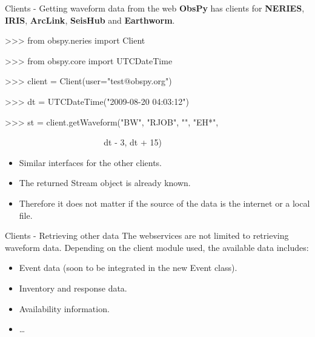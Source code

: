 \documentclass[handout]{beamer}
\begin{document}
\begin{frame}[plain]{Clients - Getting waveform data from the web}
    \textbf{ObsPy} has clients for \textbf{NERIES}, \textbf{IRIS}, \textbf{ArcLink}, \textbf{SeisHub} and \textbf{Earthworm}.

\begin{myColorBox}{0.95}{}
\begin{semiverbatim}
>>> from obspy.neries import Client

>>> from obspy.core import UTCDateTime

>>> client = Client(user="test@obspy.org")

>>> dt = UTCDateTime("2009-08-20 04:03:12")

>>> st = client.getWaveform("BW", "RJOB", "", "EH*", \

~ ~ ~ ~ ~ ~ ~ ~ ~ ~ ~ ~ ~ ~ dt - 3, dt + 15)
\end{semiverbatim}
\end{myColorBox}
\begin{itemize}
    \item Similar interfaces for the other clients.
    \item The returned Stream object is already known.
    \item Therefore it does not matter if the source of the data is the internet or a local file.
\end{itemize}
\end{frame}


\begin{frame}[plain]{Clients - Retrieving other data}
    The webservices are not limited to retrieving waveform data. Depending on the client module used, the available data includes:
    \vspace{2em}
    \begin{itemize}
        \item Event data (soon to be integrated in the new Event class).
        \item Inventory and response data.
        \item Availability information.
        \item \dots
    \end{itemize}
\end{frame}
\end{document}
